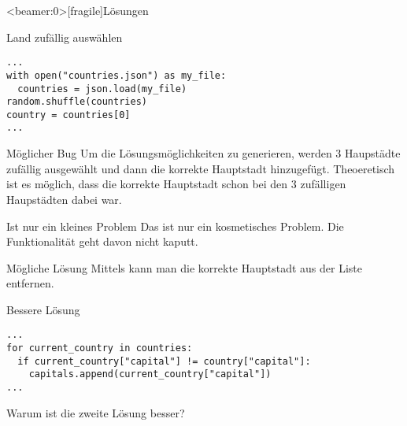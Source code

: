 \begin{frame}<beamer:0>[fragile]{Lösungen}
	
\begin{solutionblock}{Land zufällig auswählen}
\begin{verbatim}
...
with open("countries.json") as my_file:
  countries = json.load(my_file)
random.shuffle(countries)
country = countries[0]
...
\end{verbatim}
\end{solutionblock}
\end{frame}


\begin{frame}
\begin{alertblock}{Möglicher Bug}
\vspace{2pt}
Um die Lösungsmöglichkeiten zu generieren, werden 3 Haupstädte zufällig ausgewählt und dann die korrekte Hauptstadt hinzugefügt. 
Theoeretisch ist es möglich, dass die korrekte Hauptstadt schon bei den 3 zufälligen Haupstädten dabei war. 
\end{alertblock}
\pause
\vspace{12pt} 
\begin{exampleblock}{Ist nur ein kleines Problem}
\vspace{2pt}
Das ist nur ein kosmetisches Problem. Die Funktionalität geht davon nicht kaputt. 
\end{exampleblock}
\end{frame}


\begin{fragile}
\begin{block}{Mögliche Lösung}
\vspace{2pt}
Mittels  kann man die korrekte Hauptstadt aus der Liste  entfernen. 
\end{block}

\pause 
\vspace{12pt}
\begin{block}{Bessere Lösung}
\vspace{2pt}
\begin{verbatim}
...
for current_country in countries:
  if current_country["capital"] != country["capital"]:
    capitals.append(current_country["capital"])
...
\end{verbatim}
\end{block}

\pause 
\vspace{12pt}


Warum ist die zweite Lösung besser?


\end{fragile}

